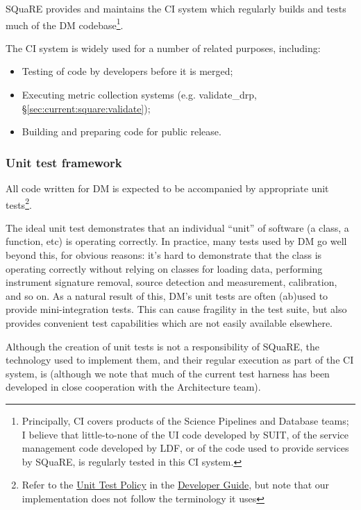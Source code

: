\documentclass[DM,authoryear,toc,lsstdraft]{lsstdoc}
\begin{document}
SQuaRE provides and maintains the CI system which regularly builds and
tests much of the DM codebase\footnote{Principally, CI covers products of
the Science Pipelines and Database teams; I believe that little-to-none of the
UI code developed by SUIT, of the service management code developed by LDF, or
of the code used to provide services by SQuaRE, is regularly tested in this CI
system.}.

The CI system is widely used for a number of related purposes, including:

\begin{itemize}

  \item{Testing of code by developers before it is merged;}
  \item{Executing metric collection systems (e.g. validate\_drp,
  \S\ref{sec:current:square:validate});}
  \item{Building and preparing code for public release.}

\end{itemize}

\subsubsection{Unit test framework}

All code written for DM is expected to be accompanied by appropriate unit
tests\footnote{Refer to the
\href{https://developer.lsst.io/coding/unit_test_policy.html}{Unit Test
Policy} in the \href{https://developer.lsst.io}{Developer Guide}, but note
that our implementation does not follow the terminology it uses}.

The ideal unit test demonstrates that an individual ``unit'' of software (a
class, a function, etc) is operating correctly. In practice, many tests used
by DM go well beyond this, for obvious reasons: it's hard to demonstrate that
the  class is operating correctly without relying on
classes for loading data, performing instrument signature removal, source
detection and measurement, calibration, and so on. As a natural result of
this, DM's unit tests are often (ab)used to provide mini-integration tests.
This can cause fragility in the test suite, but also provides convenient
test capabilities which are not easily available elsewhere.

Although the creation of unit tests is not a responsibility of SQuaRE, the
technology used to implement them, and their regular execution as part of the
CI system, is (although we note that much of the current test harness has been
developed in close cooperation with the Architecture team).
\end{document}

